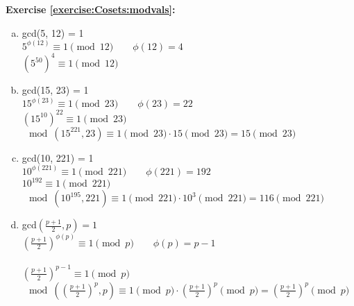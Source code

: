 \noindent\textbf{Exercise \ref{exercise:Cosets:modvals}:}
\begin{enumerate}[(a)]
\item
gcd(5, 12) = 1
\\
$5^{\phi(12)} \equiv 1 \pmod{12} \quad \quad \phi(12) = 4$
\\
$(5^{50})^4 \equiv 1 \pmod{12}$


\item
gcd(15, 23) = 1
\\
$15^{\phi(23)} \equiv 1 \pmod{23} \quad \quad \phi(23) = 22$
\\
$(15^{10})^{22} \equiv 1 \pmod{23}$
\\
$\mod(15^{221}, 23) \equiv 1 \pmod{23} \cdot 15 \pmod{23} = 15 \pmod{23}$



\item
gcd(10, 221) = 1
\\
$10^{\phi(221)} \equiv 1 \pmod{221} \quad \quad \phi(221) = 192$
\\
$10^{192} \equiv 1 \pmod{221}$
\\
$\mod(10^{195},221) \equiv 1 \pmod{221} \cdot 10^3 \pmod{221} = 116 \pmod{221}$

\item
gcd$(\frac{p+1}{2}, p) = 1$
\\
$\left(\frac{p+1}{2}\right)^{\phi(p)} \equiv 1 \pmod{p} \quad \quad \phi(p) = p - 1$
\\
\\
$\left(\frac{p+1}{2}\right)^{p-1} \equiv 1 \pmod{p}$
\\
$\mod \left( \left( \frac{p+1}{2} \right)^p,p\right) \equiv 1 \pmod{p} \cdot \left( \frac{p+1}{2} \right)^p \pmod{p} =  \left( \frac{p+1}{2} \right)^p \pmod{p}$
\end{enumerate}

